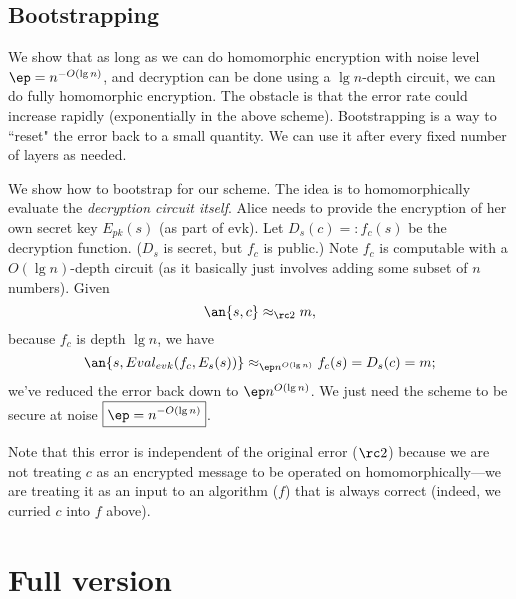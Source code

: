 \subsection{Bootstrapping}

We show that as long as we can do homomorphic encryption with noise level $\ep=n^{-O(\lg n)}$, and decryption can be done using a $\lg n$-depth circuit, we can do fully homomorphic encryption. The obstacle is that the error rate could increase rapidly (exponentially in the above scheme). Bootstrapping is a way to ``reset" the error back to a small quantity. We can use it after every fixed number of layers as needed.

We show how to bootstrap for our scheme. 
The idea is to homomorphically evaluate the {\it decryption circuit itself}. Alice needs to provide the encryption of her own secret key $E_{pk}(s)$ (as part of evk). 
Let $D_s(c)=:f_c(s)$ be the decryption function. ($D_s$ is secret, but $f_c$ is public.) Note $f_c$ is computable with a $O(\lg n)$-depth circuit (as it basically just involves adding some subset of $n$ numbers). 
Given
\[
\an{s,c}\approx_{\rc 2}m,
\]
because $f_c$ is depth $\lg n$, we have
\[\an{s,Eval_{evk}(f_c,E_{s}(s))} \approx_{\ep n^{O(\lg n)}} f_c(s) = D_s(c) = m;\]
we've reduced the error back down to $\ep n^{O(\lg n)}$. We just need the scheme to be secure at noise $\boxed{\ep=n^{-O(\lg n)}}$.

Note that this error is independent of the original error ($\rc2$) because we are not treating $c$ as an encrypted message to be operated on homomorphically---we are treating it as an input to an algorithm ($f$) that is always correct (indeed, we curried $c$ into $f$ above).

\section{Full version}
\label{sec:full}
